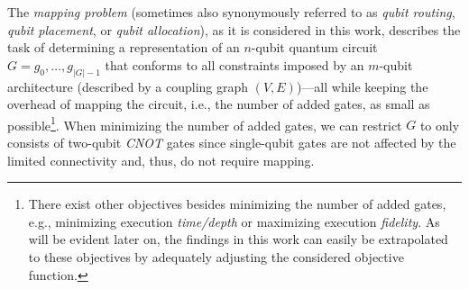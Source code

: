 \documentclass[10pt,conference]{IEEEtran}
\begin{document}
The \emph{mapping problem} (sometimes also synonymously referred to as \emph{qubit routing}, \emph{qubit placement}, or \emph{qubit allocation}), as it is considered in this work, describes the task of determining a representation of an \mbox{$n$-qubit} quantum circuit $G=g_0,\dots,g_{|G|-1}$ that conforms to all constraints imposed by an $m$-qubit architecture (described by a coupling graph $(V, E)$)---all while keeping the overhead of mapping the circuit, i.e., the number of added gates, as small as possible\footnote{There exist other objectives besides minimizing the number of added gates, e.g., minimizing execution \emph{time/depth} or maximizing execution \emph{fidelity}. As will be evident later on, the findings in this work can easily be extrapolated to these objectives by adequately adjusting the considered objective function.}.
When minimizing the number of added gates, we can restrict $G$ to only consists of two-qubit \textit{CNOT} gates since single-qubit gates are not affected by the limited connectivity and, thus, do not require mapping.
\end{document}
